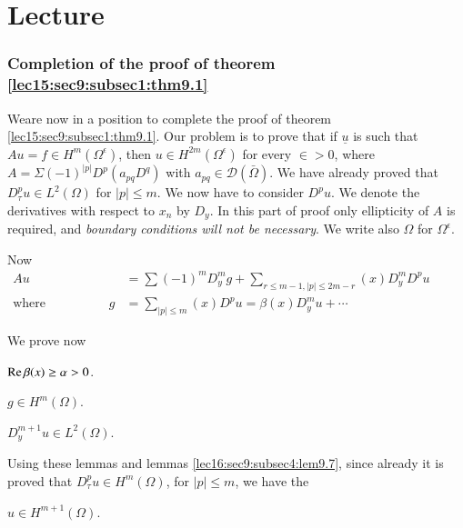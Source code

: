 
\chapter{Lecture}\label{lec17}%
\setcounter{section}{9}

\subsection{Completion of the proof of theorem \ref{lec15:sec9:subsec1:thm9.1}}
\label{lec17:sec9:subsec5}

We\pageoriginale are now in a position to complete the proof of theorem 
\ref{lec15:sec9:subsec1:thm9.1}. Our
problem is to prove that if $\underline{u}$ is such that $Au = f
\in H^m (\Omega^\epsilon )$, then $u \in H^{2m}
(\Omega^\epsilon)$ for every $\in > 0$, where $A =\Sigma
(-1)^{|p|}D^p (a_{pq} D^q)$ with $a_{pq} \in \mathscr{D}
(\bar{\Omega})$. We have already proved that $D^p_\tau u \in
L^2 (\Omega)$ for $|p| \leq m$. We now have to consider $D^p u$. We
denote the derivatives with respect to $x_n$ by $D_y$. In this part of
proof only ellipticity of $A$ is required, and \textit{boundary
  conditions will not be necessary}. We write also $\Omega$ for
$\Omega^\epsilon$.  

Now
\begin{align*}
  Au & = \sum (-1)^m D^m_y g+ \sum_{r 
    \leq m-1 , |p| \leq   2m-r} (x) D^m_y D^p u \hspace{1cm}\tag{1}
  \label{lec17:sec9:subsec5:eq1}\\
  \text{where}~ \hspace{2cm} g &= \sum_{|p| \leq m} (x) D^p u = \beta
  (x) D^m_y u + \cdots \tag{2}\label{lec17:sec9:subsec5:eq2}
\end{align*}

We prove now
\begin{lemma}\label{lec17:sec9:subsec5:lem9.8}%
  $\operatorname{Re}  \beta (x) \geq \alpha > 0 $. 
\end{lemma}

\begin{lemma}\label{lec17:sec9:subsec5:lem9.9}%
  $g \in H^m (\Omega)$. 
\end{lemma}

\begin{lemma}\label{lec17:sec9:subsec5:lem9.10}%
  $D^{m+1}_y u \in  L^2 (\Omega )$. 
\end{lemma}

Using these lemmas and lemmas \ref{lec16:sec9:subsec4:lem9.7}, since already it is proved that
$D^p_\tau u \in H^m (\Omega)$, for $|p| \leq m$, we have the  
\begin{corollary}\label{lec17:sec9:subsec5:coro9.1}%
  $u \in H^{m+1} (\Omega)$. 
\end{corollary}

